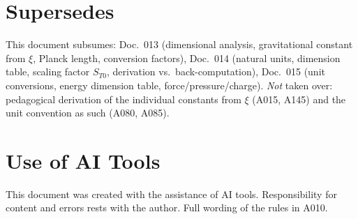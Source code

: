 \section{Supersedes}

This document subsumes: Doc.~013 (dimensional analysis, gravitational constant
from $\xi$, Planck length, conversion factors), Doc.~014 (natural units,
dimension table, scaling factor $S_{T0}$, derivation vs.\ back-computation),
Doc.~015 (unit conversions, energy dimension table, force/pressure/charge).
\emph{Not} taken over: pedagogical derivation of the individual constants from
$\xi$ (A015, A145) and the unit convention as such (A080, A085).

\section{Use of AI Tools}

This document was created with the assistance of AI tools. Responsibility
for content and errors rests with the author. Full wording of the rules in A010.
